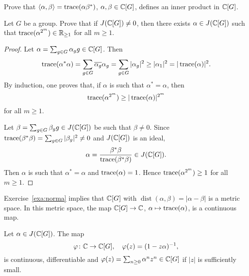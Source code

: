 \begin{exercise}
	Prove that  
	$\langle\alpha,\beta\rangle=\operatorname{trace}(\alpha\beta^*)$, $\alpha,\beta\in\mathbb{C}[G]$, 
	defines an inner product in $\mathbb{C}[G]$.
\end{exercise}

\begin{lemma}
	\label{lem:algebraico}
	Let $G$ be a group. Prove that if $J(\mathbb{C}[G])\ne 0$, then there exists $\alpha\in J(\mathbb{C}[G])$ such that  
	$\operatorname{trace}(\alpha^{2^m})\in\mathbb{R}_{\geq1}$ 
	for all $m\geq1$.
\end{lemma}

\begin{proof}
	Let $\alpha=\sum_{g\in G}\alpha_gg\in\mathbb{C}[G]$. Then 
	\[
		\operatorname{trace}(\alpha^*\alpha)
		=\sum_{g\in G}\overline{\alpha_g}\alpha_g
		=\sum_{g\in G}|\alpha_g|^2\geq|\alpha_1|^2
		=|\operatorname{trace}(\alpha)|^2.
	\]
	By induction, one proves that, if 
    $\alpha$ is such that $\alpha^*=\alpha$, then  
    \[
    \operatorname{trace}(\alpha^{2^m})\geq|\operatorname{trace}(\alpha)|^{2^m}
    \]
	for all $m\geq1$. 

	Let $\beta=\sum_{g\in G}\beta_gg\in J(\mathbb{C}[G])$ be such that $\beta\ne0$. Since 
	$\operatorname{trace}(\beta^*\beta)=\sum_{g\in G}|\beta_g|^2\ne0$ and $J(\mathbb{C}[G])$ is an ideal, 
	\[
		\alpha=\frac{\beta^*\beta}{\operatorname{trace}(\beta^*\beta)}\in J(\mathbb{C}[G]).
	\]
	Then $\alpha$ is such that $\alpha^*=\alpha$ and $\operatorname{trace}(\alpha)=1$.
	Hence $\operatorname{trace}(\alpha^{2^m})\geq 1$  for all $m\geq1$.
\end{proof}

Exercise~\ref{exa:norma} implies that $\mathbb{C}[G]$ with 
$\operatorname{dist}(\alpha,\beta)=|\alpha-\beta|$ is a metric space. In this metric space, the map 
$\mathbb{C}[G]\to\mathbb{C}$, $\alpha\mapsto \operatorname{trace}(\alpha)$, is a continuous map. 

\begin{lemma}
	\label{lem:phi_diferenciable}
	Let $\alpha\in J(\mathbb{C}[G])$. The map 
	\[
		\varphi\colon\mathbb{C}\to\mathbb{C}[G],\quad
		\varphi(z)=(1-z\alpha)^{-1},
	\]
	is continuous, differentiable and $\varphi(z)=\sum_{n\geq0}\alpha^nz^n\in\mathbb{C}[G]$ if  $|z|$
	is sufficiently small. 
\end{lemma}

